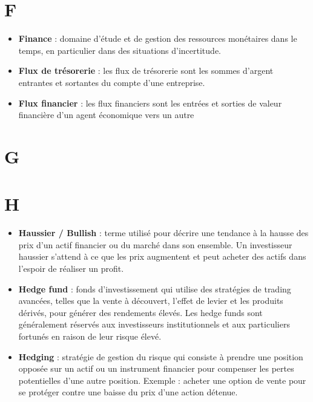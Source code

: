 \documentclass[a4paper,10pt]{article}
\begin{document}
\begin{multicols}{2}
\section*{F}
\begin{itemize}
  \item \textbf{Finance} : domaine d’étude et de gestion des ressources monétaires dans le temps, en particulier dans des situations d’incertitude.
  \item \textbf{Flux de trésorerie} : les flux de trésorerie sont les sommes d'argent entrantes et sortantes du compte d'une entreprise.
  \item \textbf{Flux financier} : les flux financiers sont les entrées et sorties de valeur financière d'un agent économique vers un autre
\end{itemize}

\section*{G}

\section*{H}
\begin{itemize}
  \item \textbf{Haussier / Bullish} : terme utilisé pour décrire une tendance à la hausse des prix d’un actif financier ou du marché dans son ensemble. Un investisseur haussier s’attend à ce que les prix augmentent et peut acheter des actifs dans l’espoir de réaliser un profit.
  \item \textbf{Hedge fund} : fonds d’investissement qui utilise des stratégies de trading avancées, telles que la vente à découvert, l’effet de levier et les produits dérivés, pour générer des rendements élevés. Les hedge funds sont généralement réservés aux investisseurs institutionnels et aux particuliers fortunés en raison de leur risque élevé.
  \item \textbf{Hedging} : stratégie de gestion du risque qui consiste à prendre une position opposée sur un actif ou un instrument financier pour compenser les pertes potentielles d’une autre position. Exemple : acheter une option de vente pour se protéger contre une baisse du prix d’une action détenue.
\end{itemize}


\end{multicols}
\end{document}
